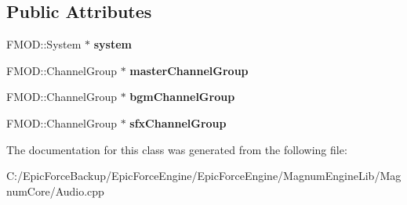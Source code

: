 \subsection*{Public Attributes}
\begin{DoxyCompactItemize}
\item 
F\+M\+O\+D\+::\+System $\ast$ {\bfseries system}\hypertarget{class_audio_desc_aa316eaec3b6e99197fce5f7132b3395d}{}\label{class_audio_desc_aa316eaec3b6e99197fce5f7132b3395d}

\item 
F\+M\+O\+D\+::\+Channel\+Group $\ast$ {\bfseries master\+Channel\+Group}\hypertarget{class_audio_desc_a83367ee607202b2eca6d79369eb0dd16}{}\label{class_audio_desc_a83367ee607202b2eca6d79369eb0dd16}

\item 
F\+M\+O\+D\+::\+Channel\+Group $\ast$ {\bfseries bgm\+Channel\+Group}\hypertarget{class_audio_desc_aecfeed73e266d43e9653ca9731a1e7a0}{}\label{class_audio_desc_aecfeed73e266d43e9653ca9731a1e7a0}

\item 
F\+M\+O\+D\+::\+Channel\+Group $\ast$ {\bfseries sfx\+Channel\+Group}\hypertarget{class_audio_desc_a7c3a36c5dbc447e09e0b35916be3f971}{}\label{class_audio_desc_a7c3a36c5dbc447e09e0b35916be3f971}

\end{DoxyCompactItemize}


The documentation for this class was generated from the following file\+:\begin{DoxyCompactItemize}
\item 
C\+:/\+Epic\+Force\+Backup/\+Epic\+Force\+Engine/\+Epic\+Force\+Engine/\+Magnum\+Engine\+Lib/\+Magnum\+Core/Audio.\+cpp\end{DoxyCompactItemize}
